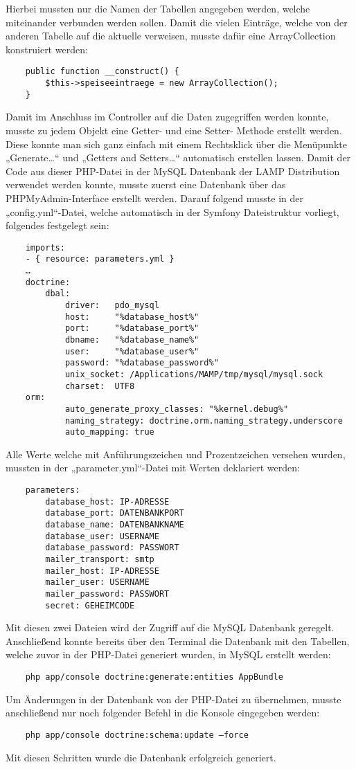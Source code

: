 	Hierbei mussten nur die Namen der Tabellen angegeben werden, welche miteinander verbunden werden sollen. Damit die vielen Einträge, welche von der anderen Tabelle auf die aktuelle verweisen, musste dafür eine ArrayCollection konstruiert werden:
	\lstset{language = php}
  	\begin{lstlisting}
  	public function __construct() {
        $this->speiseeintraege = new ArrayCollection();
    }
  	\end{lstlisting}
	Damit im Anschluss im Controller auf die Daten zugegriffen werden konnte, musste zu jedem Objekt eine Getter- und eine Setter- Methode erstellt werden. Diese konnte man sich ganz einfach mit einem Rechtsklick über die Menüpunkte „Generate…“ und „Getters and Setters…“ automatisch erstellen lassen.
	Damit der Code aus dieser PHP-Datei in der MySQL Datenbank der LAMP Distribution verwendet werden konnte, musste zuerst eine Datenbank über das PHPMyAdmin-Interface erstellt werden. Darauf folgend musste in der „config.yml“-Datei, welche automatisch in der Symfony Dateistruktur vorliegt, folgendes festgelegt sein:
	\lstset{language = php}
  	\begin{lstlisting}
  	imports:
    - { resource: parameters.yml }
	…
	doctrine:
   	 	dbal:
        	driver:   pdo_mysql
        	host:     "%database_host%"
        	port:     "%database_port%"
        	dbname:   "%database_name%"
        	user:     "%database_user%"
        	password: "%database_password%"
        	unix_socket: /Applications/MAMP/tmp/mysql/mysql.sock
        	charset:  UTF8
	orm:
        	auto_generate_proxy_classes: "%kernel.debug%"
        	naming_strategy: doctrine.orm.naming_strategy.underscore
      	  	auto_mapping: true
  	\end{lstlisting}
	Alle Werte welche mit Anführungszeichen und Prozentzeichen versehen wurden, mussten in der „parameter.yml“-Datei mit Werten deklariert werden:
	\lstset{language = php}
  	\begin{lstlisting}
  	parameters:
    	database_host: IP-ADRESSE
    	database_port: DATENBANKPORT
    	database_name: DATENBANKNAME
    	database_user: USERNAME
    	database_password: PASSWORT
    	mailer_transport: smtp
    	mailer_host: IP-ADRESSE
    	mailer_user: USERNAME
    	mailer_password: PASSWORT
    	secret: GEHEIMCODE
  	\end{lstlisting}
	Mit diesen zwei Dateien wird der Zugriff auf die MySQL Datenbank geregelt.
	Anschließend konnte bereits über den Terminal die Datenbank mit den Tabellen, welche zuvor in der PHP-Datei generiert wurden, in MySQL erstellt werden:
	\lstset{language = bash}
  	\begin{lstlisting}
	php app/console doctrine:generate:entities AppBundle
  	\end{lstlisting}
	Um Änderungen in der Datenbank von der PHP-Datei zu übernehmen, musste anschließend nur noch folgender Befehl in die Konsole eingegeben werden:
	\lstset{language = bash}
  	\begin{lstlisting}
	php app/console doctrine:schema:update —force
  	\end{lstlisting}
	Mit diesen Schritten wurde die Datenbank erfolgreich generiert.

